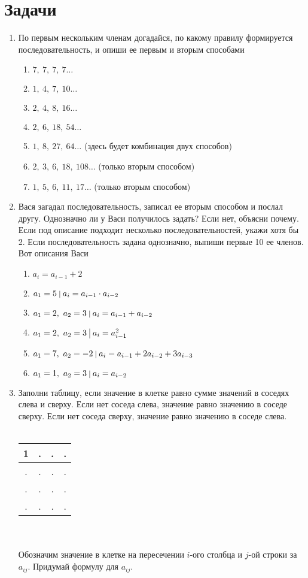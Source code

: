 \documentclass[12pt]{article} %
\begin{document}
	\section*{Задачи}
	\begin{enumerate}
		\item По первым нескольким членам догадайся, по какому правилу формируется последовательность, и опиши ее первым и вторым способами
		\begin{enumerate}
			\item $7,\ 7,\ 7,\ 7\ldots$
			\item $1,\ 4,\ 7,\ 10\ldots$
			\item $2,\ 4,\ 8,\ 16\ldots$
			\item $2,\ 6,\ 18,\ 54\ldots$
			\item $1,\ 8,\ 27,\ 64\ldots$ (здесь будет комбинация двух способов)
			\item $2,\ 3,\ 6,\ 18,\ 108\ldots$ (только вторым способом)
			\item $1,\ 5,\ 6,\ 11,\ 17\ldots$ (только вторым способом)
		\end{enumerate}
		\item Вася загадал последовательность, записал ее вторым способом и послал другу. Однозначно ли у Васи получилось задать? Если нет, объясни почему. Если под описание подходит несколько последовательностей, укажи хотя бы 2. Если последовательность задана однозначно, выпиши первые 10 ее членов. Вот описания Васи
		\begin{enumerate}
			\item $a_i = a_{i - 1} + 2$
			\item $a_1 = 5\ \vline \ a_i = a_{i - 1} \cdot a_{i - 2}$
			\item $a_1 = 2,\ a_2 = 3\ \vline \ a_i = a_{i-1} + a_{i-2}$
			\item $a_1 = 2,\ a_2 = 3\ \vline \ a_i = a_{i-1}^2$
			\item $a_1 = 7,\ a_2 = -2\ \vline \ a_i = a_{i - 1} + 2a_{i - 2} + 3a_{i - 3}$ 
			\item $a_1 = 1,\ a_2 = 3\ \vline\ a_i = a_{i - 2}$
		\end{enumerate} 
		\newpage
		\item Заполни таблицу, если значение в клетке равно сумме значений в соседях слева и сверху. Если нет соседа слева, значение равно значению в соседе сверху. Если нет соседа сверху, значение равно значению в соседе слева.\\
		\\
		\begin{tabular}{|c|c|c|c|}
			\hline
			1 & . & . & . \\
			\hline 
			. & . & . & . \\
			\hline
				. & . & . & . \\
			\hline
				. & . & . & . \\
			\hline
		\end{tabular}
		\\ \\
		Обозначим значение в клетке на пересечении $i$-ого столбца и $j$-ой строки за $a_{ij}$. Придумай формулу для $a_{ij}$. 
	\end{enumerate}
	
\end{document}
